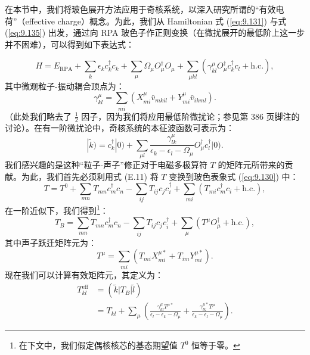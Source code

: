 在本节中，我们将玻色展开方法应用于奇核系统，以深入研究所谓的“有效电荷”（effective charge）概念。为此，我们从 Hamiltonian
式 (\ref{eq:9.131}) 与式 (\ref{eq:9.135}) 出发，通过向 RPA 玻色子作正则变换（在微扰展开的最低阶上这一步并不困难），可以得到如下表达式：

\begin{equation}
H=E_{\text{RPA}}+\sum_{k}\epsilon_{k}c^{\dagger}_{k}c_{k}+\sum_{\mu}\Omega_{\mu}O^{\dagger}_{\mu}O_{\mu}+\sum_{\mu kl}\left(\gamma^{\mu}_{kl}O^{\dagger}_{\mu}c^{\dagger}_{k}c_{l}+\text{h.c.}\right),\label{eq:9.150}
\end{equation}
其中微观粒子-振动耦合顶点为：
\begin{equation}
\gamma^{\mu}_{kl}=\sum_{mi}\left(X^{\mu}_{mi}\bar{v}_{mkil}+Y^{\mu}_{mi}\bar{v}_{ikml}\right).\label{eq:9.151}
\end{equation}
（此处我们略去了 $\frac{1}{2}$ 因子，因为我们将应用最低阶微扰论；参见第 386 页脚注的讨论）。在有一阶微扰论中，奇核系统的本征波函数可表示为：
\begin{equation}
|\tilde{k})=c^{\dagger}_{k}|0)+\sum_{\mu l}\frac{\gamma^{\mu}_{lk}}{\epsilon_{k}-\epsilon_{l}-\Omega_{\mu}}O^{\dagger}_{\mu}c^{\dagger}_{l}|0).\label{eq:9.152}
\end{equation}
我们感兴趣的是这种“粒子-声子”修正对于电磁多极算符 $T$ 的矩阵元所带来的贡献。为此，我们首先必须利用式 (E.11) 将 $T$
变换到玻色表象式 (\ref{eq:9.130}) 中：
\begin{equation}
T=T^{0}+\sum_{mn}T_{mn}c^{\dagger}_{m}c_{n}-\sum_{ij}T_{ij}c_{j}c^{\dagger}_{i}+\sum_{mi}\left(T_{mi}c^{\dagger}_{m}c_{i}+\text{h.c.}\right),\label{eq:9.153}
\end{equation}
在一阶近似下，我们得到\footnote{在下文中，我们假定偶核核芯的基态期望值 $T^{0}$ 恒等于零。}：
\begin{equation}
T_{B}=\sum_{mn}T_{mn}c^{\dagger}_{m}c_{n}-\sum_{ij}T_{ij}c_{j}c^{\dagger}_{i}+\sum_{\mu}\left(T^{\mu}O^{\dagger}_{\mu}+\text{h.c.}\right),\label{eq:9.154}
\end{equation}
其中声子跃迁矩阵元为：
\begin{equation}
T^{\mu}=\sum_{mi}\left(T_{mi}X^{\mu*}_{mi}+T_{im}Y^{\mu*}_{mi}\right).\label{eq:9.155}
\end{equation}
现在我们可以计算有效矩阵元，其定义为：
\begin{align}
T^{\text{eff}}_{kl} & =(\tilde{k}|T_{B}|\tilde{l})\nonumber \\
 & =T_{kl}+\sum_{\mu}\left(\frac{\gamma^{\mu}_{kl}T^{\mu*}}{\epsilon_{l}-\epsilon_{k}-\Omega_{\mu}}+\frac{\gamma^{\mu*}_{lk}T^{\mu}}{\epsilon_{k}-\epsilon_{l}-\Omega_{\mu}}\right).\label{eq:9.156}
\end{align}

